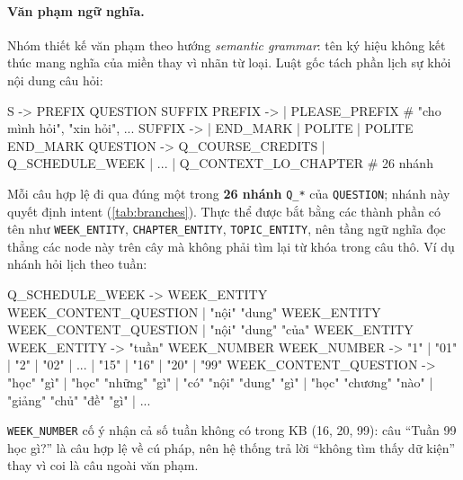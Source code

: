\paragraph{Văn phạm ngữ nghĩa.} Nhóm thiết kế văn phạm theo hướng \emph{semantic
grammar}: tên ký hiệu không kết thúc mang nghĩa của miền thay vì nhãn từ loại. Luật gốc
tách phần lịch sự khỏi nội dung câu hỏi:
\begin{grammar}
S        -> PREFIX QUESTION SUFFIX
PREFIX   -> | PLEASE_PREFIX                 # "cho mình hỏi", "xin hỏi", ...
SUFFIX   -> | END_MARK | POLITE | POLITE END_MARK
QUESTION -> Q_COURSE_CREDITS | Q_SCHEDULE_WEEK | ... | Q_CONTEXT_LO_CHAPTER   # 26 nhánh
\end{grammar}
Mỗi câu hợp lệ đi qua đúng một trong \textbf{26 nhánh} \texttt{Q\_*} của
\texttt{QUESTION}; nhánh này quyết định intent (\cref{tab:branches}). Thực thể được bắt
bằng các thành phần có tên như \texttt{WEEK\_ENTITY}, \texttt{CHAPTER\_ENTITY},
\texttt{TOPIC\_ENTITY}, nên tầng ngữ nghĩa đọc thẳng các node này trên cây mà không phải
tìm lại từ khóa trong câu thô. Ví dụ nhánh hỏi lịch theo tuần:
\begin{grammar}
Q_SCHEDULE_WEEK       -> WEEK_ENTITY WEEK_CONTENT_QUESTION
                       | "nội" "dung" WEEK_ENTITY WEEK_CONTENT_QUESTION
                       | "nội" "dung" "của" WEEK_ENTITY
WEEK_ENTITY           -> "tuần" WEEK_NUMBER
WEEK_NUMBER           -> "1" | "01" | "2" | "02" | ... | "15" | "16" | "20" | "99"
WEEK_CONTENT_QUESTION -> "học" "gì" | "học" "những" "gì" | "có" "nội" "dung" "gì"
                       | "học" "chương" "nào" | "giảng" "chủ" "đề" "gì" | ...
\end{grammar}
\texttt{WEEK\_NUMBER} cố ý nhận cả số tuần không có trong KB (16, 20, 99): câu ``Tuần 99
học gì?'' là câu hợp lệ về cú pháp, nên hệ thống trả lời ``không tìm thấy dữ kiện''
thay vì coi là câu ngoài văn phạm.

